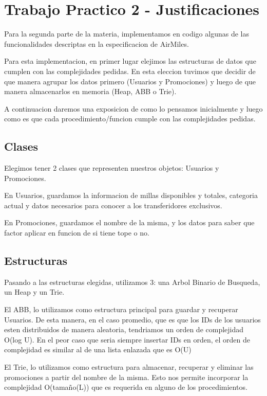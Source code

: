 \documentclass[11pt,a4paper]{article}
\begin{document}
\maketitle
\section{Trabajo Practico 2 - Justificaciones}
Para la segunda parte de la materia, implementamos en codigo algunas de las funcionalidades descriptas en la especificacion de AirMiles.


Para esta implementacion, en primer lugar elejimos las estructuras de datos que cumplen con las complejidades pedidas. En esta eleccion tuvimos que decidir de que manera agrupar los datos primero (Usuarios y Promociones) y luego de que manera almacenarlos en memoria (Heap, ABB o Trie).

A continuacion daremos una exposicion de como lo pensamos inicialmente y luego como es que cada procedimiento/funcion cumple con las complejidades pedidas.

\subsection{Clases}
Elegimos tener 2 clases que representen nuestros objetos: Usuarios y Promociones.

En Usuarios, guardamos la informacion de millas disponibles y totales, categoria actual y datos necesarios para conocer a los transferidores exclusivos.

En Promociones, guardamos el nombre de la misma, y los datos para saber que factor aplicar en funcion de si tiene tope o no.

\subsection{Estructuras}
Pasando a las estructuras elegidas, utilizamos 3: una Arbol Binario de Busqueda, un Heap y un Trie.

El ABB, lo utilizamos como estructura principal para guardar y recuperar Usuarios. De esta manera, en el caso promedio, que es que los IDs de los usuarios esten distribuidos de manera aleatoria, tendriamos un orden de complejidad O(log U). En el peor caso que seria siempre insertar IDs en orden, el orden de complejidad es similar al de una lista enlazada que es O(U)

El Trie, lo utilizamos como estructura para almacenar, recuperar y eliminar las promociones a partir del nombre de la misma. Esto nos permite incorporar la complejidad O(tamaño(L)) que es requerida en alguno de los procedimientos.
\end{document}

